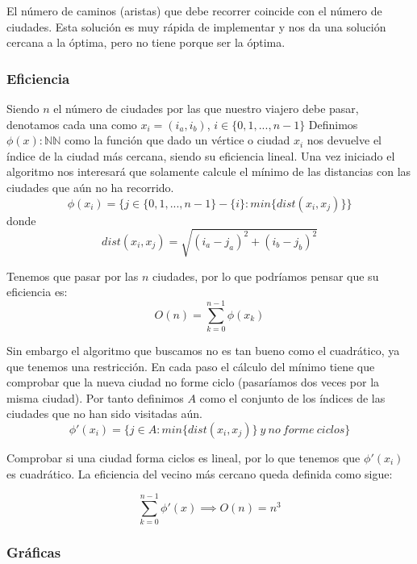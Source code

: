 El número de caminos (aristas) que debe recorrer coincide con el número de ciudades.
Esta solución es muy rápida de implementar y nos da una solución cercana a la óptima, pero no tiene porque ser la óptima.

\subsubsection{Eficiencia}
Siendo $n$ el número de ciudades por las que nuestro viajero debe pasar, denotamos cada una como $x_i=(i_a, i_b)$, $i\in\{0,1,...,n-1\}$
Definimos $\phi (x):\mathbb{N}  \mathbb{N}$ como la función que dado un vértice o ciudad $x_i$ nos devuelve el 
índice de la ciudad más cercana, siendo su eficiencia lineal. Una vez iniciado el algoritmo nos interesará que solamente calcule
el mínimo de las distancias con las ciudades que aún no ha recorrido.
\[\phi (x_i) = \{j \in\{0,1,...,n-1\}-\{i\} : min\{dist(x_i, x_j)\} \}\]
donde 
\[ dist(x_i, x_j) = \sqrt{(i_a-j_a)^2+(i_b-j_b)^2} \]

Tenemos que pasar por las $n$ ciudades, por lo que podríamos pensar que su eficiencia es:
\[O(n) = \sum_{k=0}^{n-1} \phi (x_k)  \]

Sin embargo el algoritmo que buscamos no es tan bueno como el cuadrático, ya que tenemos una restricción. En cada paso el cálculo
del mínimo tiene que comprobar que la nueva ciudad no forme ciclo (pasaríamos dos veces por la misma ciudad).
Por tanto definimos $A$ como el conjunto de los índices de las ciudades que no han sido visitadas aún.
\[\phi '(x_i) = \{j \in A : min\{dist(x_i, x_j)\} \ y \ no \ forme \ ciclos \}\]

Comprobar si una ciudad forma ciclos es lineal, por lo que tenemos que $\phi '(x_i)$ es cuadrático.
La eficiencia del vecino más cercano queda definida como sigue:

\[ \sum_{k=0}^{n-1}\phi ' (x) \implies O(n) = n^3\]

\subsubsection{Gráficas}
